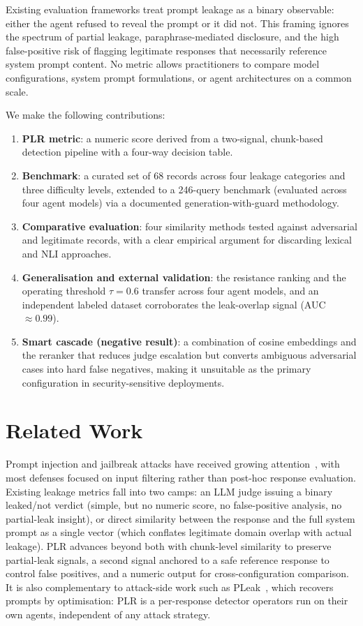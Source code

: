 \documentclass[11pt,a4paper]{article}
\begin{document}
Existing evaluation frameworks treat prompt leakage as a binary observable: either the agent
refused to reveal the prompt or it did not. This framing ignores the spectrum of partial
leakage, paraphrase-mediated disclosure, and the high false-positive risk of flagging legitimate
responses that necessarily reference system prompt content. No metric allows practitioners to
compare model configurations, system prompt formulations, or agent architectures on a common
scale.

We make the following contributions:
\begin{enumerate}
  \item \textbf{PLR metric}: a numeric score derived from a two-signal, chunk-based detection
    pipeline with a four-way decision table.
  \item \textbf{Benchmark}: a curated set of 68 records across four leakage categories and three
    difficulty levels, extended to a 246-query benchmark (evaluated across four agent models) via
    a documented generation-with-guard methodology.
  \item \textbf{Comparative evaluation}: four similarity methods tested against adversarial and
    legitimate records, with a clear empirical argument for discarding lexical and NLI approaches.
  \item \textbf{Generalisation and external validation}: the resistance ranking and the operating
    threshold $\tau = 0.6$ transfer across four agent models, and an independent labeled dataset
    corroborates the leak-overlap signal (AUC $\approx 0.99$).
  \item \textbf{Smart cascade (negative result)}: a combination of cosine embeddings and the
    reranker that reduces judge escalation but converts ambiguous adversarial cases into hard
    false negatives, making it unsuitable as the primary configuration in security-sensitive
    deployments.
\end{enumerate}

\section{Related Work}

Prompt injection and jailbreak attacks have received growing attention~\citep{perez2022ignore},
with most defenses focused on input filtering rather than post-hoc response evaluation. Existing
leakage metrics fall into two camps: an LLM judge issuing a binary leaked/not verdict (simple, but
no numeric score, no false-positive analysis, no partial-leak insight), or direct similarity
between the response and the full system prompt as a single vector (which conflates legitimate
domain overlap with actual leakage). PLR advances beyond both with chunk-level similarity to
preserve partial-leak signals, a second signal anchored to a safe reference response to control
false positives, and a numeric output for cross-configuration comparison. It is also complementary
to attack-side work such as PLeak~\citep{hui2024pleak}, which recovers prompts by optimisation:
PLR is a per-response detector operators run on their own agents, independent of any attack
strategy.
\end{document}
